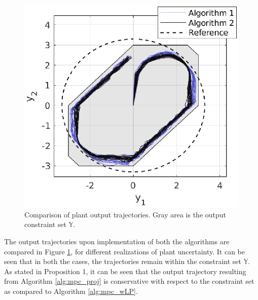 \documentclass[letterpaper, 10 pt, conference]{ieeeconf}  %
\begin{document}
	\begin{figure}[h]
		\vspace{-3pt}
		\hspace{20pt}
		\includegraphics[scale=0.6]{output_performance.eps}
		\caption{Comparison of plant output trajectories. Gray area is the output constraint set $\mathbb{Y}$.}
		\label{fig:y_trajectories}
	\end{figure} 
	\vspace{-8pt} 
The output trajectories upon implementation of both the algorithms are compared in Figure \ref{fig:y_trajectories}, for different realizations of plant uncertainty. It can be seen that in both the cases, the trajectories remain within the constraint set $\mathbb{Y}$. As stated in Proposition 1, it can be seen that the output trajectory resulting from Algorithm \ref{alg:mpc_proj} is conservative with respect to the constraint set as compared to Algorithm \ref{alg:mpc_wLP}. 
\end{document}
